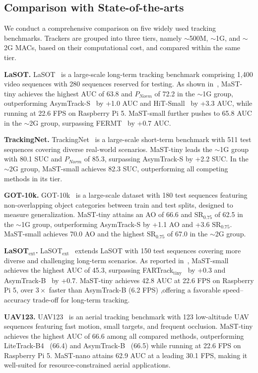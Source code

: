 \subsection{Comparison with State-of-the-arts}
We conduct a comprehensive comparison on five widely used tracking benchmarks. Trackers are grouped into three tiers, namely $\sim$500M, $\sim$1G, and $\sim$2G MACs, based on their computational cost, and compared within the same tier.

\textbf{LaSOT.} LaSOT~\cite{lasot} is a large-scale long-term tracking benchmark comprising 1,400 video sequences with 280 sequences reserved for testing. As shown in~, MaST-tiny achieves the highest AUC of 63.8 and $P_{Norm}$ of 72.2 in the $\sim$1G group, outperforming AsymTrack-S~\cite{zhu2025asymtrack} by +1.0 AUC and HiT-Small~\cite{HiT} by +3.3 AUC, while running at 22.6 FPS on Raspberry Pi 5. MaST-small further pushes to 65.8 AUC in the $\sim$2G group, surpassing FERMT~\cite{fermt} by +0.7 AUC.

\textbf{TrackingNet.} TrackingNet~\cite{trackingnet} is a large-scale short-term benchmark with 511 test sequences covering diverse real-world scenarios. MaST-tiny leads the $\sim$1G group with 80.1 SUC and $P_{Norm}$ of 85.3, surpassing AsymTrack-S by +2.2 SUC. In the $\sim$2G group, MaST-small achieves 82.3 SUC, outperforming all competing methods in its tier.

\textbf{GOT-10k.} GOT-10k~\cite{got10k} is a large-scale dataset with 180 test sequences featuring non-overlapping object categories between train and test splits, designed to measure generalization. MaST-tiny attains an AO of 66.6 and $\text{SR}_{0.75}$ of 62.5 in the $\sim$1G group, outperforming AsymTrack-S by +1.1 AO and +3.6 $\text{SR}_{0.75}$. MaST-small achieves 70.0 AO and the highest $\text{SR}_{0.75}$ of 67.0 in the $\sim$2G group.


\textbf{LaSOT$_{\text{ext}}$.} LaSOT$_{\text{ext}}$~\cite{lasot} extends LaSOT with 150 test sequences covering more diverse and challenging long-term scenarios. As reported in~, MaST-small achieves the highest AUC of 45.3, surpassing FARTrack$_\text{tiny}$~\cite{wang2026fartrack} by +0.3 and AsymTrack-B~\cite{zhu2025asymtrack} by +0.7. MaST-tiny achieves 42.8 AUC at 22.6 FPS on Raspberry Pi 5, over $3{\times}$ faster than AsymTrack-B (6.2 FPS) ,offering a favorable speed--accuracy trade-off for long-term tracking.

\textbf{UAV123.} UAV123~\cite{uav123} is an aerial tracking benchmark with 123 low-altitude UAV sequences featuring fast motion, small targets, and frequent occlusion. MaST-tiny achieves the highest AUC of 66.6 among all compared methods, outperforming LiteTrack-B4~\cite{LiteTrack} (66.4) and AsymTrack-B~\cite{zhu2025asymtrack} (66.5) while running at 22.6 FPS on Raspberry Pi 5. MaST-nano attains 62.9 AUC at a leading 30.1 FPS, making it well-suited for resource-constrained aerial applications.


